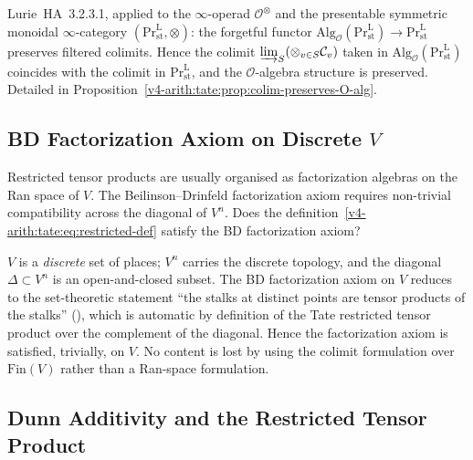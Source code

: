 \begin{correction}
Lurie~HA~3.2.3.1, applied to the \(\infty\)-operad
\(\mathcal{O}^{\otimes}\) and the presentable symmetric monoidal
\(\infty\)-category \((\mathrm{Pr}^{\mathrm{L}}_{\mathrm{st}},\otimes)\):
the forgetful functor
\(\mathrm{Alg}_{\mathcal{O}}(\mathrm{Pr}^{\mathrm{L}}_{\mathrm{st}})\to\mathrm{Pr}^{\mathrm{L}}_{\mathrm{st}}\)
preserves filtered colimits. Hence the colimit
\(\varinjlim_{S}(\otimes_{v\in S}\mathcal{C}_{v})\) taken in
\(\mathrm{Alg}_{\mathcal{O}}(\mathrm{Pr}^{\mathrm{L}}_{\mathrm{st}})\)
coincides with the colimit in \(\mathrm{Pr}^{\mathrm{L}}_{\mathrm{st}}\),
and the \(\mathcal{O}\)-algebra structure is preserved. Detailed in
Proposition~\ref{v4-arith:tate:prop:colim-preserves-O-alg}.
\end{correction}

\subsection{BD Factorization Axiom on Discrete \(V\)}

\begin{obstruction}
Restricted tensor products are usually organised as factorization
algebras on the Ran space of \(V\). The Beilinson--Drinfeld
factorization axiom requires non-trivial compatibility across the
diagonal of \(V^{n}\). Does the
definition~\eqref{v4-arith:tate:eq:restricted-def} satisfy the BD
factorization axiom?
\end{obstruction}

\begin{correction}[discreteness of \(V\)]
\(V\) is a \emph{discrete} set of places; \(V^{n}\) carries the discrete
topology, and the diagonal \(\Delta\subset V^{n}\) is an open-and-closed
subset. The BD factorization axiom on \(V\) reduces to the
set-theoretic statement ``the stalks at distinct points are tensor
products of the stalks'' (),
which is automatic by definition of the Tate restricted tensor product
over the complement of the diagonal. Hence the factorization axiom
is satisfied, trivially, on \(V\). No content is lost by using the
colimit formulation over \(\mathrm{Fin}(V)\) rather than a Ran-space
formulation.
\end{correction}

\subsection{Dunn Additivity and the Restricted Tensor Product}

